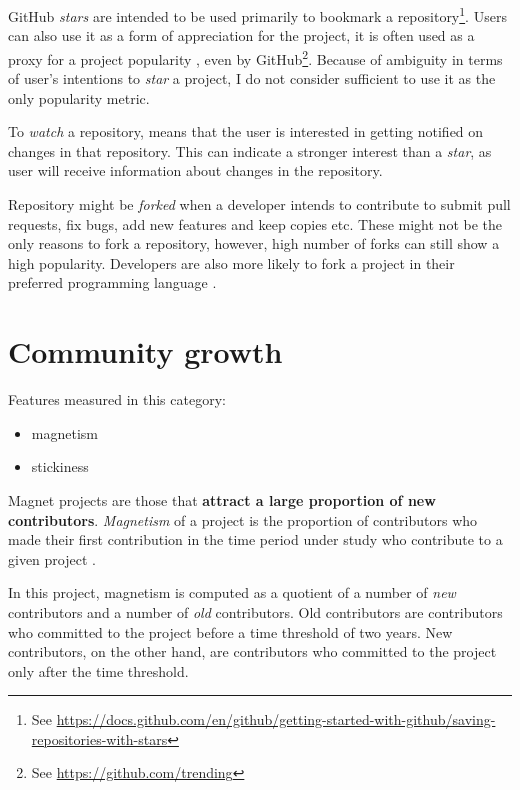 GitHub \emph{stars} are intended to be used primarily to bookmark a repository\footnote{See \url{https://docs.github.com/en/github/getting-started-with-github/saving-repositories-with-stars}}.
Users can also use it as a form of appreciation for the project, it is often used as a proxy for a project popularity \cite{p:1} \cite{p:2} \cite{p:3} \cite{p:6}, even by GitHub\footnote{See \url{https://github.com/trending}}.
Because of ambiguity in terms of user's intentions to \emph{star} a project, I do not consider sufficient to use it as the only popularity metric.

To \emph{watch} a repository, means that the user is interested in getting notified on changes in that repository.
This can indicate a stronger interest than a \emph{star}, as user will receive information about changes in the repository.

Repository might be \emph{forked} when a developer intends to contribute to submit pull requests, fix bugs, add new features and keep copies etc.
These might not be the only reasons to fork a repository, however, high number of forks can still show a high popularity.
Developers are also more likely to fork a project in their preferred programming language \cite{p:10}.

\section{Community growth}
\label{sec:comm_growth}

Features measured in this category:

\begin{itemize}
    \item magnetism
    \item stickiness
\end{itemize}

Magnet projects are those that \textbf{attract a large proportion of new contributors}.
\emph{Magnetism} of a project is the proportion of contributors who made their first contribution in the time period under study who contribute to a given project \cite{p:11}.

In this project, magnetism is computed as a quotient of a number of \emph{new} contributors and a number of \emph{old} contributors.
Old contributors are contributors who committed to the project before a time threshold of two years.
New contributors, on the other hand, are contributors who committed to the project only after the time threshold.

